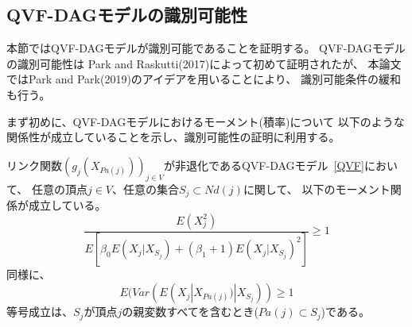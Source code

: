 
\subsection{QVF-DAGモデルの識別可能性}

本節ではQVF-DAGモデルが識別可能であることを証明する。
QVF-DAGモデルの識別可能性は
Park and Raskutti(2017)\cite{Park2017-hw}によって初めて証明されたが、
本論文ではPark and Park(2019)\cite{Park2019-qy}のアイデアを用いることにより、
識別可能条件の緩和も行う。

まず初めに、QVF-DAGモデルにおけるモーメント(積率)について
以下のような関係性が成立していることを示し、識別可能性の証明に利用する。

\begin{prop}
  リンク関数$(g_j(X_{Pa(j)}))_{j \in V}$が非退化であるQVF-DAGモデル~\eqref{QVF}において、
  任意の頂点$j \in V$、任意の集合$S_j \subset \mathit{Nd}(j)$に関して、
  以下のモーメント関係が成立している。
  \begin{equation}
    \frac{E(X_j^2)}
    {E \left[ \beta_0 E(X_j | X_{S_j}) + (\beta_1 + 1)E(X_j | X_{S_j})^2 \right]}
    \geq 1
  \end{equation}
  同様に、
  \begin{equation}
    E(\mathit{Var}( E(X_j | X_{Pa(j)}) | X_{S_j} )) \geq 1
  \end{equation}
  等号成立は、$S_j$が頂点$j$の親変数すべてを含むとき($Pa(j)\subset S_j$)である。
\end{prop}

